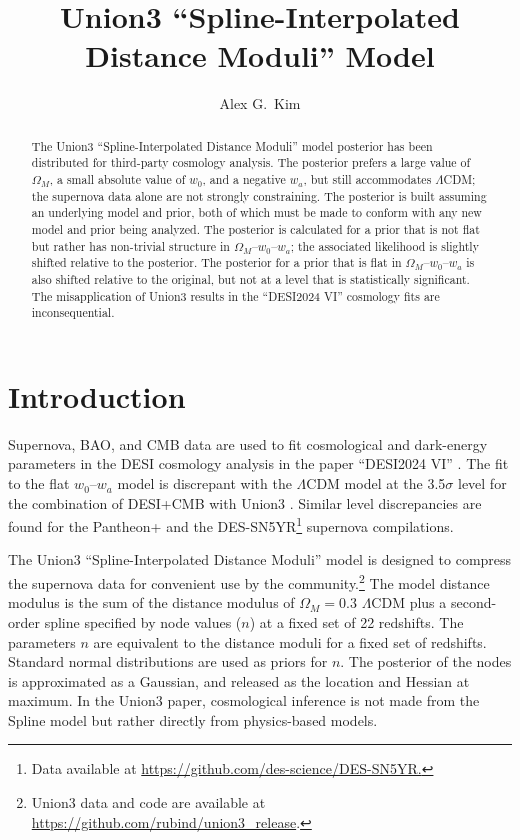 \documentclass{aastex631}
\begin{document}
\title{Union3 ``Spline-Interpolated Distance Moduli'' Model}
\author[0000-0001-6315-8743]{Alex G.\ Kim}

\begin{abstract}
The Union3 ``Spline-Interpolated Distance Moduli'' model posterior has been distributed for third-party cosmology analysis. The posterior prefers a large value of
$\Omega_M$, a small absolute value of $w_0$, and a negative $w_a$, but still accommodates  $\Lambda$CDM; the supernova data alone are not strongly constraining.  The posterior is built assuming an underlying model and prior, both of which must be made to conform with any new model and prior being analyzed.
The posterior is calculated for
a  prior that is not flat but rather has non-trivial structure in $\Omega_M$--$w_0$--$w_a$;
the associated likelihood is slightly shifted relative to the posterior.
The  posterior for a prior that is flat in $\Omega_M$--$w_0$--$w_a$ is also shifted relative to the original, but not
at a level that is  statistically significant.    The misapplication of Union3 results in the  ``DESI2024 VI'' cosmology
fits are inconsequential.
\end{abstract}


\section{Introduction}
Supernova, BAO, and CMB data are used to fit cosmological and dark-energy parameters in the DESI cosmology
analysis in the paper ``DESI2024 VI''  \citep{2024arXiv240403002D}.  The fit to the flat $w_0$--$w_a$ model is discrepant with the $\Lambda$CDM
model at the 3.5$\sigma$ level for the combination of DESI+CMB with Union3  \cite{2023arXiv231112098R}.
Similar level discrepancies are found for the Pantheon+ \cite{2022ApJ...938..113S} and the DES-SN5YR\footnote{Data available at \url{https://github.com/des-science/DES-SN5YR.}} supernova compilations.

The Union3 ``Spline-Interpolated Distance Moduli'' model is designed to compress the  supernova data for convenient use by the community.\footnote{Union3 data and code are available at \url{https://github.com/rubind/union3_release}.}
The  model distance modulus
is the sum of the distance modulus of $\Omega_M=0.3$  $\Lambda$CDM plus a second-order spline specified by node values ($n$)
at a fixed set of 22 redshifts. 
The parameters $n$ are equivalent to the distance moduli for a fixed set of redshifts.
Standard normal distributions are used as priors for $n$.  
The posterior of the nodes is approximated as a Gaussian, and released as the location and Hessian at maximum.
In the Union3 paper, cosmological inference is not made from the Spline model but rather directly from physics-based models.
\end{document}
